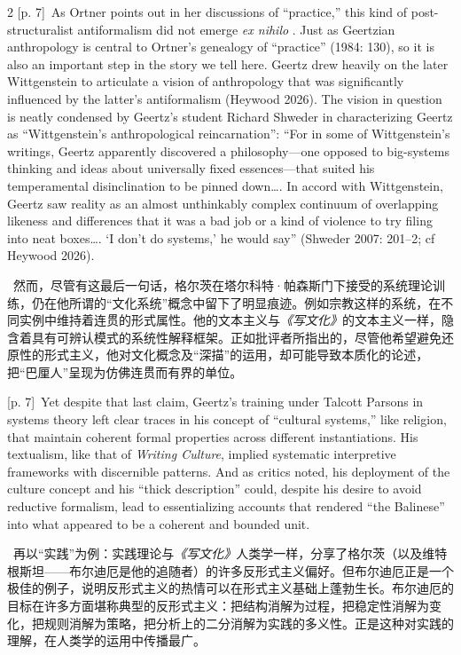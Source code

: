 \documentclass[10pt,a4paper]{article}
\begin{document}
\begin{paracol}{2}
{\scriptsize\color{gray} [p. 7]}\ As Ortner points out in her discussions of “practice,” this kind of post-structuralist antiformalism did not emerge \textit{ex nihilo} . Just as Geertzian anthropology is central to Ortner’s genealogy of “practice” (1984: 130), so it is also an important step in the story we tell here. Geertz drew heavily on the later Wittgenstein to articulate a vision of anthropology that was significantly influenced by the latter’s antiformalism (Heywood 2026). The vision in question is neatly condensed by Geertz’s student Richard Shweder in characterizing Geertz as “Wittgenstein’s anthropological reincarnation”: “For in some of Wittgenstein’s writings, Geertz apparently discovered a philosophy—one opposed to big-systems thinking and ideas about universally fixed essences—that suited his temperamental disinclination to be pinned down…. In accord with Wittgenstein, Geertz saw reality as an almost unthinkably complex continuum of overlapping likeness and differences that it was a bad job or a kind of violence to try filing into neat boxes…. ‘I don’t do systems,’ he would say” (Shweder 2007: 201–2; cf Heywood 2026).\par
\switchcolumn*
{\scriptsize\color{gray} [p. 7]}\ 然而，尽管有这最后一句话，格尔茨在塔尔科特·帕森斯门下接受的系统理论训练，仍在他所谓的“文化系统”概念中留下了明显痕迹。例如宗教这样的系统，在不同实例中维持着连贯的形式属性。他的文本主义与\textit{《写文化》}的文本主义一样，隐含着具有可辨认模式的系统性解释框架。正如批评者所指出的，尽管他希望避免还原性的形式主义，他对文化概念及“深描”的运用，却可能导致本质化的论述，把“巴厘人”呈现为仿佛连贯而有界的单位。\par
\switchcolumn
{\scriptsize\color{gray} [p. 7]}\ Yet despite that last claim, Geertz’s training under Talcott Parsons in systems theory left clear traces in his concept of “cultural systems,” like religion, that maintain coherent formal properties across different instantiations. His textualism, like that of \textit{Writing Culture}, implied systematic interpretive frameworks with discernible patterns. And as critics noted, his deployment of the culture concept and his “thick description” could, despite his desire to avoid reductive formalism, lead to essentializing accounts that rendered “the Balinese” into what appeared to be a coherent and bounded unit.\par
\switchcolumn*
{\scriptsize\color{gray} [p. 7]}\ 再以“实践”为例：实践理论与\textit{《写文化》}人类学一样，分享了格尔茨（以及维特根斯坦——布尔迪厄是他的追随者）的许多反形式主义偏好。但布尔迪厄正是一个极佳的例子，说明反形式主义的热情可以在形式主义基础上蓬勃生长。布尔迪厄的目标在许多方面堪称典型的反形式主义：把结构消解为过程，把稳定性消解为变化，把规则消解为策略，把分析上的二分消解为实践的多义性。正是这种对实践的理解，在人类学的运用中传播最广。\par

\end{paracol}
\end{document}
